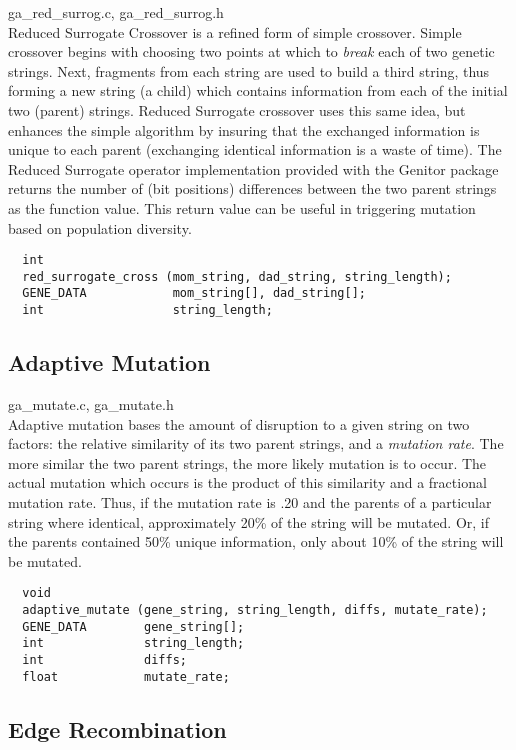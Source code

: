 ga\_red\_surrog.c, ga\_red\_surrog.h
\\
Reduced Surrogate Crossover is a refined form of simple crossover.  Simple
crossover begins with choosing two points at which to {\it break} each of
two genetic strings.  Next, fragments from each string are used to build
a third string, thus forming a new string (a child) which contains
information from each of the initial two (parent) strings.  Reduced
Surrogate crossover uses this same idea, but enhances the simple
algorithm by insuring that the exchanged information is unique to each
parent (exchanging identical information is a waste of time).  The
Reduced Surrogate operator implementation provided with the Genitor package
returns the number of (bit positions) differences between the two parent
strings as the function value.  This return value can be useful in triggering 
mutation based on population diversity.  

\begin{verbatim}
  int
  red_surrogate_cross (mom_string, dad_string, string_length);
  GENE_DATA            mom_string[], dad_string[];
  int                  string_length;

\end{verbatim}

\subsection{Adaptive Mutation}

ga\_mutate.c, ga\_mutate.h
\\
Adaptive mutation bases the amount of disruption to a given string
on two factors: the relative similarity of its two parent strings,
and a {\it mutation rate}.  The more similar the two parent strings,
the more likely mutation is to occur.  The actual mutation which
occurs is the product of this similarity and a fractional mutation
rate.  Thus, if the mutation rate is .20 and the parents of a particular
string where identical, approximately 20\% of the string will be mutated.
Or, if the parents contained 50\% unique information, only about 10\% of
the string will be mutated.
\begin{verbatim}
  void
  adaptive_mutate (gene_string, string_length, diffs, mutate_rate);
  GENE_DATA        gene_string[];
  int              string_length;
  int              diffs;
  float            mutate_rate;

\end{verbatim}

\subsection{Edge Recombination}

